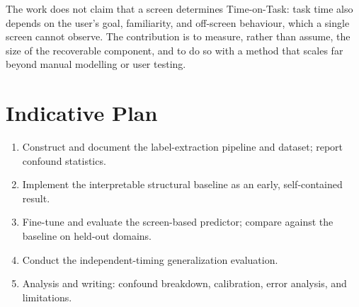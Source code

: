 \documentclass[11pt,a4paper]{article}
\begin{document}
\noindent
The work does not claim that a screen determines Time-on-Task: task time also depends on the user's goal, familiarity, and off-screen behaviour, which a single screen cannot observe. The contribution is to measure, rather than assume, the size of the recoverable component, and to do so with a method that scales far beyond manual modelling or user testing.

\section{Indicative Plan}
\begin{enumerate}[label=\arabic*.]
  \item Construct and document the label-extraction pipeline and dataset; report confound statistics.
  \item Implement the interpretable structural baseline as an early, self-contained result.
  \item Fine-tune and evaluate the screen-based predictor; compare against the baseline on held-out domains.
  \item Conduct the independent-timing generalization evaluation.
  \item Analysis and writing: confound breakdown, calibration, error analysis, and limitations.
\end{enumerate}
\end{document}
